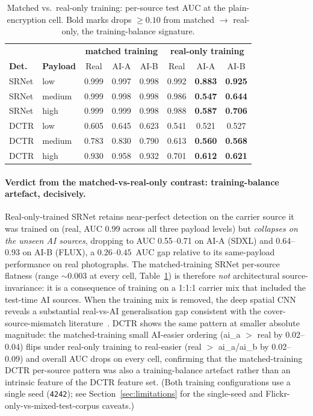 \documentclass[10pt,twocolumn,a4paper]{article}
\begin{document}
\begin{table}[!htbp]
\centering\footnotesize
\caption{Matched vs.\ real-only training: per-source test AUC at the plain-encryption cell. Bold marks drops $\geq 0.10$ from matched $\to$ real-only, the training-balance signature.}
\label{tab:v1-vs-v2a}
\setlength{\tabcolsep}{3pt}\renewcommand{\arraystretch}{1.05}
\begin{tabular}{@{}ll | ccc | ccc@{}}
\toprule
& & \multicolumn{3}{c}{\textbf{matched training}} & \multicolumn{3}{c}{\textbf{real-only training}} \\
\textbf{Det.} & \textbf{Payload} & Real & AI-A & AI-B & Real & AI-A & AI-B \\
\midrule
SRNet & low    & 0.999 & 0.997 & 0.998 & 0.992 & \textbf{0.883} & \textbf{0.925} \\
SRNet & medium & 0.999 & 0.998 & 0.998 & 0.986 & \textbf{0.547} & \textbf{0.644} \\
SRNet & high   & 0.999 & 0.999 & 0.998 & 0.988 & \textbf{0.587} & \textbf{0.706} \\
DCTR  & low    & 0.605 & 0.645 & 0.623 & 0.541 & 0.521 & 0.527 \\
DCTR  & medium & 0.783 & 0.830 & 0.790 & 0.613 & \textbf{0.560} & \textbf{0.568} \\
DCTR  & high   & 0.930 & 0.958 & 0.932 & 0.701 & \textbf{0.612} & \textbf{0.621} \\
\bottomrule
\end{tabular}
\end{table}

\paragraph{Verdict from the matched-vs-real-only contrast: training-balance artefact, decisively.} Real-only-trained SRNet retains near-perfect detection on the carrier source it was trained on (real, AUC 0.99 across all three payload levels) but \emph{collapses on the unseen AI sources}, dropping to AUC 0.55--0.71 on AI-A (SDXL) and 0.64--0.93 on AI-B (FLUX), a $0.26$--$0.45$~AUC gap relative to its same-payload performance on real photographs.  The matched-training SRNet per-source flatness (range $\sim$0.003 at every cell, Table~\ref{tab:v1-vs-v2a}) is therefore \emph{not} architectural source-invariance: it is a consequence of training on a 1:1:1 carrier mix that included the test-time AI sources. When the training mix is removed, the deep spatial CNN reveals a substantial real-vs-AI generalisation gap consistent with the cover-source-mismatch literature~\cite{giboulot2020csm,mallet2024csm,mereur2024deepfake}. DCTR shows the same pattern at smaller absolute magnitude: the matched-training small AI-easier ordering (ai\_a $>$ real by 0.02--0.04) flips under real-only training to real-easier (real $>$ ai\_a/ai\_b by 0.02--0.09) and overall AUC drops on every cell, confirming that the matched-training DCTR per-source pattern was also a training-balance artefact rather than an intrinsic feature of the DCTR feature set. (Both training configurations use a single seed (\texttt{4242}); see Section~\ref{sec:limitations} for the single-seed and Flickr-only-vs-mixed-test-corpus caveats.)
\end{document}
